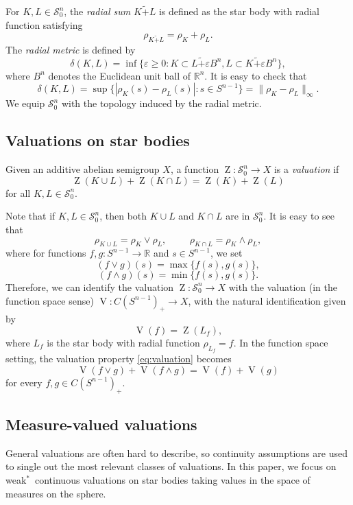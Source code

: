 \documentclass[11pt, a4paper]{amsart}
\newcommand{\sn}{{S^{n-1}}}
\newcommand{\ra}{\mathbin{\tilde +}}
\newcommand{\oZ}{\operatorname{Z}}
\newcommand{\oV}{\operatorname{V}}
\newcommand{\starn}{\mathcal S_{\scriptscriptstyle 0}^n}
\newcommand{\cfn}{C(\sn )_{\scriptscriptstyle +}}
\newcommand{\R}{\mathbb R}
\newcommand{\rn}{\mathbb R^n}
\begin{document}
For $K,L\in \starn$, the {\em radial sum} $K \ra L$ is defined as the star body with radial function satisfying
$$
\rho_{K\ra L}=\rho_K+\rho_L.
$$
The \emph{radial metric} is defined by
$$
\delta(K,L)=\inf\{\varepsilon\geq 0 : K\subset L\ra  \varepsilon B^n, L\subset K\ra  \varepsilon B^n\},
$$
where $B^n$ denotes the Euclidean unit ball of $\rn$. It is easy to check that
$$
\delta(K,L)=\sup\{|\rho_K(s)-\rho_L(s)|: s\in \sn \}=\|\rho_K-\rho_L\|_{\scriptscriptstyle \infty}.
$$
We equip $\starn$ with the topology induced by the radial metric.



\subsection{Valuations on star bodies}
Given an additive abelian semigroup $X$, a function $\oZ\colon\starn\to X$ is a {\em valuation} if 
\begin{equation}\label{eq:valuation}
\oZ(K\cup L)+\oZ(K\cap L)=\oZ(K)+ \oZ(L)
\end{equation}
for all $K,L\in\starn$.


Note that if $K, L \in\starn$, then both $K\cup L$ and $K\cap L$ are in $\starn$. It is easy to see that
$$
\rho_{K\cup L}=\rho_K\vee \rho_L, \hspace{1cm} \rho_{K\cap L}=\rho_K\wedge \rho_L,
$$
where for functions $f, g\colon\sn \to \R$ and $s\in \sn $, we set
$$
(f\vee g)(s)=\max \{f(s), g(s)\},
$$
$$
(f\wedge g)(s)=\min \{f(s), g(s)\}.
$$
Therefore, we can identify  the valuation  $\oZ\colon\starn\rightarrow X$  with the valuation (in the function space sense)  $ \oV\colon \cfn\rightarrow X$,
with the natural identification given by
\begin{equation}\label{eq_star}
 \oV(f)=\oZ(L_f),
\end{equation}
where $L_f$ is the star body with radial function $\rho_{L_f}=f$. In the function space setting, the valuation property \eqref{eq:valuation} becomes
\begin{equation}\label{eq:valuationfunctions}
\oV(f\vee g)+\oV(f\wedge g)=\oV(f)+ \oV(g)
\end{equation}
for every $f,g \in \cfn$.

 

\subsection{Measure-valued valuations}\label{ss:measure_valued}
General valuations are often hard to describe, so continuity assumptions are used to single out the most relevant classes of valuations. In this paper, we focus on weak$^*$~continuous valuations on star bodies taking values in the space of measures on the sphere. 
\end{document}
